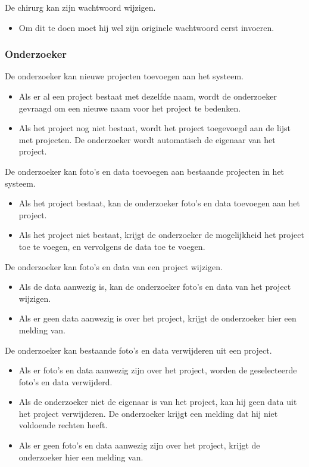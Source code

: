 \noindent
De chirurg kan zijn wachtwoord wijzigen.
\begin{itemize}
	\item Om dit te doen moet hij wel zijn originele wachtwoord eerst invoeren.
\end{itemize}

\subsubsection{Onderzoeker}

De onderzoeker kan nieuwe projecten toevoegen aan het systeem.
\begin{itemize}
	\item Als er al een project bestaat met dezelfde naam, wordt de onderzoeker gevraagd om een nieuwe naam voor het project te bedenken.
	\item Als het project nog niet bestaat, wordt het project toegevoegd aan de lijst met projecten. De onderzoeker wordt automatisch de eigenaar van het project.
\end{itemize}

\noindent
De onderzoeker kan foto's en data toevoegen aan bestaande projecten in het systeem.
\begin{itemize}
	\item Als het project bestaat, kan de onderzoeker foto's en data toevoegen aan het project.
	\item Als het project niet bestaat, krijgt de onderzoeker de mogelijkheid het project toe te voegen, en vervolgens de data toe te voegen.
\end{itemize}

\noindent
De onderzoeker kan foto's en data van een project wijzigen.
\begin{itemize}
	\item Als de data aanwezig is, kan de onderzoeker foto's en data van het project wijzigen.
  \item Als er geen data aanwezig is over het project, krijgt de onderzoeker hier een melding van.
\end{itemize}

\noindent
De onderzoeker kan bestaande foto's en data verwijderen uit een project.
\begin{itemize}
	\item Als er foto's en data aanwezig zijn over het project, worden de geselecteerde foto's en data verwijderd.
	\item Als de onderzoeker niet de eigenaar is van het project, kan hij geen data uit het project verwijderen. De onderzoeker krijgt een melding dat hij niet voldoende rechten heeft. 
	\item Als er geen foto's en data aanwezig zijn over het project, krijgt de onderzoeker hier een melding van.
\end{itemize}

